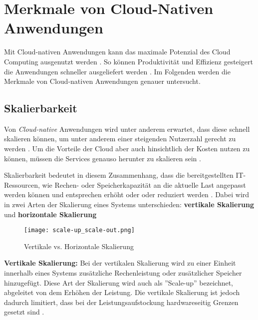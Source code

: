 \section{Merkmale von Cloud-Nativen Anwendungen}
\label{sec:cloud-native-anwendungen}
Mit Cloud-nativen Anwendungen kann das maximale Potenzial des Cloud Computing ausgenutzt werden \cite[Vgl.][]{VMwareb}. So können Produktivität und Effizienz gesteigert die Anwendungen schneller ausgeliefert werden \cite[Vgl][S. 12]{Chandrasekaran2022}. Im Folgenden werden die Merkmale von Cloud-nativen Anwendungen genauer untersucht.

\subsection{Skalierbarkeit}
Von \textit{Cloud-native} Anwendungen wird unter anderem erwartet, dass diese schnell skalieren können, um unter anderem einer steigenden Nutzerzahl gerecht zu werden \cite[Vgl.][S. 1ff]{Armbrust2009} \cite[Vgl.][S. 234]{Villamizar2017}. Um die Vorteile der Cloud aber auch hinsichtlich der Kosten nutzen zu können, müssen die Services genauso herunter zu skalieren sein \cite[Vgl.][S. 884]{Adzic2017}.

Skalierbarkeit bedeutet in diesem Zusammenhang, dass die bereitgestellten IT-Ressourcen, wie Rechen- oder Speicherkapazität an die aktuelle Last angepasst werden können und entsprechen erhöht oder oder reduziert werden \cite[Vgl.][S. 15]{Reinheimer2018}\cite[Vgl.][]{Geißler2019}. Dabei wird in zwei Arten der Skalierung eines Systems unterschieden: \textbf{vertikale Skalierung} und \textbf{horizontale Skalierung} \cite[Vgl.][]{Geißler2019}\cite[Vgl.][]{VMware}

\begin{figure}[H]
    \centering
    \texttt{[image: scale-up\_scale-out.png]}
    \caption{Vertikale vs. Horizontale Skalierung \cite[Nachbildung nach][]{Bachmann2019}}
    \label{fig:scale-up-scale-out}
\end{figure}

\textbf{Vertikale Skalierung:}
Bei der vertikalen Skalierung wird zu einer Einheit innerhalb eines Systems zusätzliche Rechenleistung oder zusätzlicher Speicher hinzugefügt. Diese Art der Skalierung wird auch als ''Scale-up'' bezeichnet, abgeleitet von dem Erhöhen der Leistung. Die vertikale Skalierung ist jedoch dadurch limitiert, dass bei der Leistungsaufstockung hardwareseitig Grenzen gesetzt sind \cite[Vgl.][]{Geißler2019}\cite[Vgl.][]{VMware}. \pagebreak

